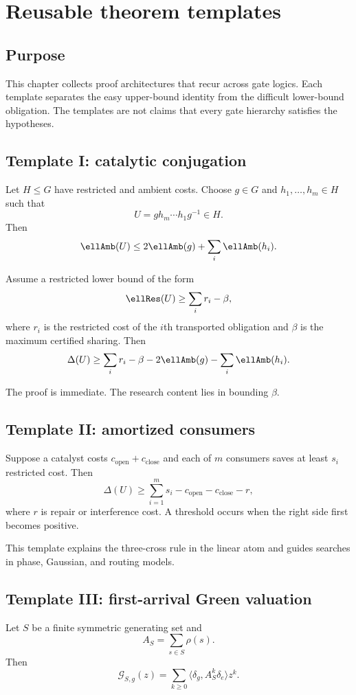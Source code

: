 \chapter{Reusable theorem templates}\label{ch:templates}


\section{Purpose}
This chapter collects proof architectures that recur across gate logics.  Each template separates the easy upper-bound identity from the difficult lower-bound obligation.  The templates are not claims that every gate hierarchy satisfies the hypotheses.

\section{Template I: catalytic conjugation}
Let $H\le G$ have restricted and ambient costs.  Choose $g\in G$ and $h_1,\ldots,h_m\in H$ such that
\[
U=g h_m\cdots h_1 g^{-1}\in H.
\]
Then
\[
\ellAmb(U)
\le
2\ellAmb(g)+\sum_i\ellAmb(h_i).
\]

\begin{theorem}
Assume a restricted lower bound of the form
\[
\ellRes(U)
\ge
\sum_i r_i-\beta,
\]
where $r_i$ is the restricted cost of the $i$th transported obligation and $\beta$ is the maximum certified sharing.  Then
\[
\Delta(U)
\ge
\sum_i r_i-\beta
-
2\ellAmb(g)-\sum_i\ellAmb(h_i).
\]
\end{theorem}

The proof is immediate.  The research content lies in bounding $\beta$.

\section{Template II: amortized consumers}
Suppose a catalyst costs $c_{\mathrm{open}}+c_{\mathrm{close}}$ and each of $m$ consumers saves at least $s_i$ restricted cost.  Then
\[
\Delta(U)
\ge
\sum_{i=1}^m s_i
-c_{\mathrm{open}}-c_{\mathrm{close}}-r,
\]
where $r$ is repair or interference cost.  A threshold occurs when the right side first becomes positive.

This template explains the three-cross rule in the linear atom and guides searches in phase, Gaussian, and routing models.

\section{Template III: first-arrival Green valuation}
Let $S$ be a finite symmetric generating set and
\[
A_S=\sum_{s\in S}\rho(s).
\]
Then
\[
\mathcal G_{S,g}(z)
=\sum_{k\ge0}\langle\delta_g,A_S^k\delta_e\rangle z^k.
\]


